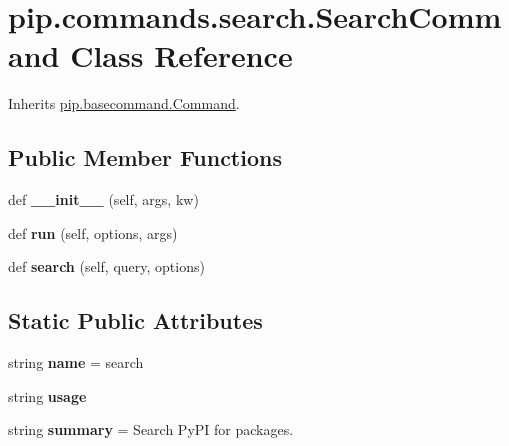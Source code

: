 \hypertarget{classpip_1_1commands_1_1search_1_1_search_command}{}\section{pip.\+commands.\+search.\+Search\+Command Class Reference}
\label{classpip_1_1commands_1_1search_1_1_search_command}


Inherits \hyperlink{classpip_1_1basecommand_1_1_command}{pip.\+basecommand.\+Command}.

\subsection*{Public Member Functions}
\begin{DoxyCompactItemize}
\item 
\mbox{\label{classpip_1_1commands_1_1search_1_1_search_command_a3ee88ad74692f3dc94dc521e3ceb6938}} 
def {\bfseries \+\_\+\+\_\+init\+\_\+\+\_\+} (self, args, kw)
\item 
\mbox{\label{classpip_1_1commands_1_1search_1_1_search_command_a68ad568a71558ef79885da9eab5d3e2f}} 
def {\bfseries run} (self, options, args)
\item 
\mbox{\label{classpip_1_1commands_1_1search_1_1_search_command_ac524cf42a16a92e2f8e6d24a92783a05}} 
def {\bfseries search} (self, query, options)
\end{DoxyCompactItemize}
\subsection*{Static Public Attributes}
\begin{DoxyCompactItemize}
\item 
\mbox{\label{classpip_1_1commands_1_1search_1_1_search_command_a5991b619e4d0d78cf578b3116a42e8ca}} 
string {\bfseries name} = \textquotesingle{}search\textquotesingle{}
\item 
string {\bfseries usage}
\item 
\mbox{\label{classpip_1_1commands_1_1search_1_1_search_command_a6b3e1a35a31295c576f245804509e3fd}} 
string {\bfseries summary} = \textquotesingle{}Search Py\+PI for packages.\textquotesingle{}
\end{DoxyCompactItemize}
